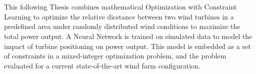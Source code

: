 \chapter{\abstractname}


This following Thesis combines mathematical Optimization with Constraint Learning to optimize the relative dicstance between two wind turbines in a predefined area under randomly distributed wind conditions to maximize the total power output. A Neural Network is trained on simulated data to model the impact of turbine positioning on power output. This model is embedded as a set of constraints in a mixed-integer optimization problem, and the problem evaluated for a current state-of-the-art wind farm configuration.

\makeatletter
{}
{\renewcommand{\abstractname}{Abstract}}
\makeatother